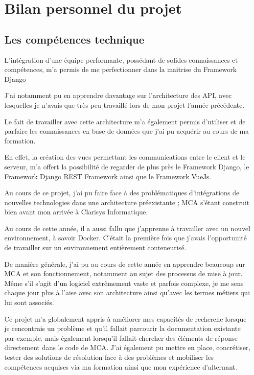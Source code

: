 \chapter{Bilan personnel du projet}
\section{Les compétences technique}
L’intégration d’une équipe performante, possédant de solides connaissances et compétences, m’a permis de me perfectionner dans la maitrise du Framework Django

J’ai notamment pu en apprendre davantage sur l’architecture des API, avec lesquelles je n’avais que très peu travaillé lors de mon projet l’année précédente. 

Le fait de travailler avec cette architecture m’a également permis d’utiliser et de parfaire les connaissances en base de données que j’ai pu acquérir au cours de ma formation. 

En effet, la création des vues permettant les communications entre le client et le serveur, m’a offert la possibilité de regarder de plus près le Framework Django, le Framework Django REST Framework ainsi que le Framework VueJs. 

Au cours de ce projet, j’ai pu faire face à des problématiques d’intégrations de nouvelles technologies dans une architecture préexistante ; MCA s’étant construit bien avant mon arrivée à Clarisys Informatique.

Au cours de cette année, il a aussi fallu que j’apprenne à travailler avec un nouvel environnement, à savoir Docker. C’était la première fois que j’avais l’opportunité de travailler sur un environnement entièrement conteneurisé.

De manière générale, j’ai pu au cours de cette année en apprendre beaucoup sur MCA et son fonctionnement, notamment au sujet des processus de mise à jour. Même s’il s’agit d’un logiciel extrêmement vaste et parfois complexe, je me sens chaque jour plus à l’aise avec son architecture ainsi qu’avec les termes métiers qui lui sont associés.

Ce projet m’a globalement appris à améliorer mes capacités de recherche lorsque je rencontrais un problème et qu’il fallait parcourir la documentation existante par exemple, mais également lorsqu’il fallait chercher des éléments de réponse directement dans le code de MCA. J’ai également pu mettre en place, concrétiser, tester des solutions de résolution face à des problèmes et mobiliser les compétences acquises via ma formation ainsi que mon expérience d’alternant.

